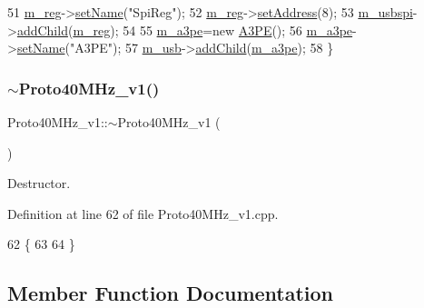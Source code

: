 \begin{DoxyCode}
51   \hyperlink{classProto40MHz__v1_a8533a6455eebc9add8e394ac2cf3af9f}{m\_reg}->\hyperlink{classObject_ae30fea75683c2d149b6b6d17c09ecd0c}{setName}(\textcolor{stringliteral}{"SpiReg"});
52   \hyperlink{classProto40MHz__v1_a8533a6455eebc9add8e394ac2cf3af9f}{m\_reg}->\hyperlink{classIOobject_ae0d372aaeafe3da3c239677118deb2ac}{setAddress}(8);
53   \hyperlink{classProto40MHz__v1_a3539294876a0bd775da282777d2091ca}{m\_usbspi}->\hyperlink{classHierarchy_ad677774ff38fcb257c04a3a10d471fac}{addChild}(\hyperlink{classProto40MHz__v1_a8533a6455eebc9add8e394ac2cf3af9f}{m\_reg});
54 
55   \hyperlink{classProto40MHz__v1_a504389d91640776389db46797ca53909}{m\_a3pe}=\textcolor{keyword}{new} \hyperlink{classA3PE}{A3PE}();
56   \hyperlink{classProto40MHz__v1_a504389d91640776389db46797ca53909}{m\_a3pe}->\hyperlink{classObject_ae30fea75683c2d149b6b6d17c09ecd0c}{setName}(\textcolor{stringliteral}{"A3PE"});
57   \hyperlink{classProto40MHz__v1_a954047995f615e6c6b60d178263cc09c}{m\_usb}->\hyperlink{classHierarchy_ad677774ff38fcb257c04a3a10d471fac}{addChild}(\hyperlink{classProto40MHz__v1_a504389d91640776389db46797ca53909}{m\_a3pe});
58 \}
\end{DoxyCode}
\mbox{\label{classProto40MHz__v1_a000cf963b1c194daf39b5f54f4ad0a62}} 
\subsubsection{\texorpdfstring{$\sim$\+Proto40\+M\+Hz\+\_\+v1()}{~Proto40MHz\_v1()}}
{\footnotesize\ttfamily Proto40\+M\+Hz\+\_\+v1\+::$\sim$\+Proto40\+M\+Hz\+\_\+v1 (\begin{DoxyParamCaption}{ }\end{DoxyParamCaption})\hspace{0.3cm}{\ttfamily [virtual]}}



Destructor. 



Definition at line 62 of file Proto40\+M\+Hz\+\_\+v1.\+cpp.


\begin{DoxyCode}
62                               \{
63 
64 \}
\end{DoxyCode}


\subsection{Member Function Documentation}
\mbox{\label{classProto40MHz__v1_a263cfc900aafa3ceee1af4b596a824de}} 
